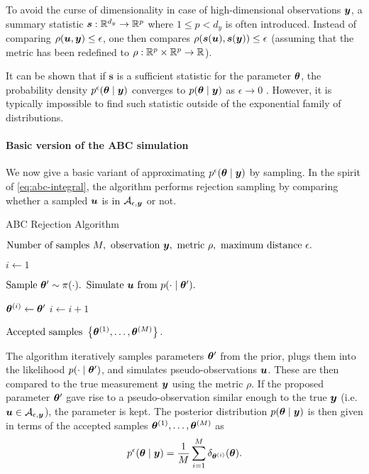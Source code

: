 To avoid the curse of dimensionality in case of high-dimensional observations $\bm{y}$, a summary statistic $\bm{s}: \mathbb{R}^{d_y} \to \mathbb{R}^p$ where $1 \leq p < d_y$ is often introduced. Instead of comparing $\rho(\bu, \by) \leq \epsilon$, one then compares $\rho(\bm{s}(\bm{u}), \bm{s}(\bm{y})) \leq \epsilon$ (assuming that the metric has been redefined to $\rho: \mathbb{R}^p \times \mathbb{R}^p \to \mathbb{R}$).

It can be shown that if $\bm{s}$ is a sufficient statistic for the parameter $\bm{\theta}$, the probability density $p^\epsilon(\bm{\theta} \mid \bm{y})$ converges to $p(\bm{\theta} \mid \bm{y})$ as $\epsilon \to 0$ \citep{jasra-time-series}. However, it is typically impossible to find such statistic outside of the exponential family of distributions.

\paragraph{Basic version of the ABC simulation}

We now give a basic variant of approximating $p^\epsilon(\bm{\theta} \mid \bm{y})$ by sampling. In the spirit of \eqref{eq:abc-integral}, the algorithm performs rejection sampling by comparing whether a sampled $\bm{u}$ is in $\mathcal{A}_{\epsilon, \bm{y}}$ or not.
\begin{algorithm}[ht]
    \caption{ABC Rejection Algorithm}
    \label{alg:abc-rejection}
    \begin{algorithmic}[1]
        \Input $\text{Number of samples } M, \text{ observation } \bm{y}, \text{ metric } \rho, \text{ maximum distance } \epsilon.$
        
        \State $i \gets 1$
        
        \State $\text{Sample } \bm{\theta}^\prime \sim \pi(\cdot).$ 
        \State $\text{Simulate } \bm{u} \text{ from } p(\cdot \mid \bm{\theta}^\prime).$ 
        
        \If {$\rho(\bu, \by) \leq \epsilon$}
        \State $\bm{\theta}^{(i)} \gets \bm{\theta}^\prime$ 
        \State $i \gets i + 1$
        \EndIf
        \EndWhile
        
        \Output $\text{Accepted samples } \left\{ \bm{\theta}^{(1)}, \ldots, \bm{\theta}^{(M)} \right\}.$
    \end{algorithmic}
\end{algorithm}

The algorithm iteratively samples parameters $\bm{\theta}^\prime$ from the prior, plugs them into the likelihood $p(\cdot \mid \bm{\theta}^\prime)$, and simulates pseudo-observations $\bm{u}$. These are then compared to the true measurement $\bm{y}$ using the metric $\rho$. If the proposed parameter $\bm{\theta}^\prime$ gave rise to a pseudo-observation similar enough to the true $\bm{y}$ (i.e. $\bm{u} \in \mathcal{A}_{\epsilon, \bm{y}}$), the parameter is kept. The posterior distribution $p(\bm{\theta} \mid \bm{y})$ is then given in terms of the accepted samples $\bm{\theta}^{(1)}, \ldots, \bm{\theta}^{(M)}$ as
\begin{equation*}
p^\epsilon(\bm{\theta} \mid \bm{y}) = \frac{1}{M} \sum_{i=1}^M \delta_{\bm{\theta}^{(i)}}(\bm{\theta}).
\end{equation*}

